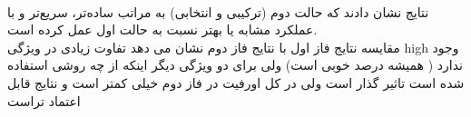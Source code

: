 \documentclass[a4paper,12pt]{article}
\begin{document}
\FloatBarrier
\\
نتایج نشان دادند که حالت دوم (ترکیبی و انتخابی) به مراتب ساده‌تر، سریع‌تر و با عملکرد مشابه یا بهتر نسبت به حالت اول عمل کرده است.\\
مقایسه نتایج فاز اول با نتایج فاز دوم نشان می دهد تفاوت زیادی در ویژگی high وجود ندارد ( همیشه درصد خوبی است) ولی برای دو ویژگی دیگر اینکه از چه روشی استفاده شده است تاثیر گذار است ولی در کل اورفیت در فاز دوم خیلی کمتر است و نتایج قابل اعتماد تراست
\end{document}
